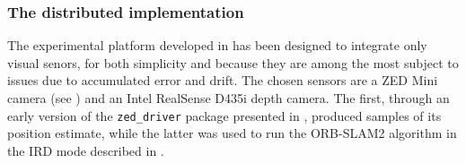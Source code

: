 \subsubsection{The distributed implementation}
\label{sec:robots_results_iccad23_impl}
The experimental platform developed in \cite{bianchi_efficient_2023} has been designed to integrate only visual senors, for both simplicity and because they are among the most subject to issues due to accumulated error and drift. The chosen sensors are a ZED Mini camera (see ) and an Intel RealSense D435i depth camera. The first, through an early version of the \texttt{zed\_driver} package presented in , produced samples of its position estimate, while the latter was used to run the ORB-SLAM2 algorithm in the IRD mode described in .

